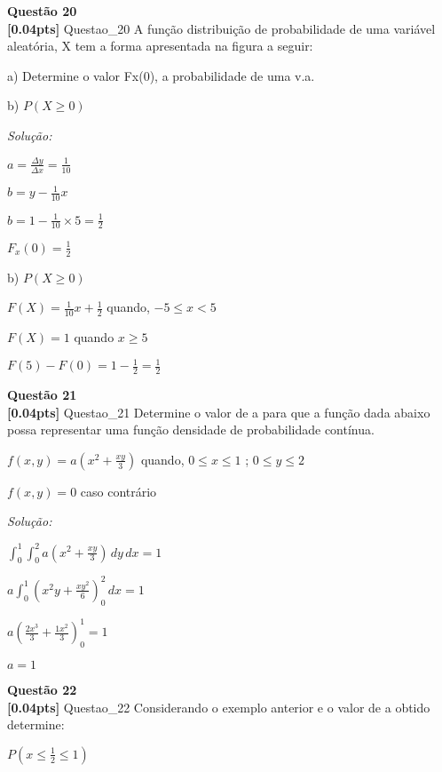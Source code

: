 \documentclass{article}
\newenvironment{problem}[2][Questão]
    { \begin{mdframed}[backgroundcolor=gray!20] \textbf{#1 #2} \\}
    {  \end{mdframed}}
\newenvironment{solution}
    {\textit{Solução:}}
    {}
\begin{document}
\begin{problem}{20}
\textbf{[0.04pts]} Questao\_20  A  função  distribuição  de  probabilidade  de  uma  variável  aleatória,  X  tem a forma apresentada na figura a seguir: 

a) Determine o valor Fx(0), a probabilidade de uma v.a.

b) $P(X \geq 0)$ 

\end{problem}

\begin{solution}

$a = \frac{\Delta y}{\Delta x} = \frac{1}{10}$

$b = y - \frac{1}{10}x$

$b = 1 - \frac{1}{10} \times 5 = \frac{1}{2}$

$F_{x}(0) = \frac{1}{2}$

b) $P(X \geq 0)$

$F(X) = \frac{1}{10}x + \frac{1}{2}$ quando, $-5 \leq x < 5$

$F(X) = 1$ quando $x \geq 5$

$F(5) - F(0) = 1 - \frac{1}{2} = \frac{1}{2}$


\end{solution}

\begin{problem}{21}
\textbf{[0.04pts]} Questao\_21 Determine  o  valor  de  a  para  que  a  função  dada  abaixo  possa  representar  uma função densidade de probabilidade contínua. 

$f(x,y) = a(x^{2} + \frac{xy}{3})$ quando, $0 \leq x \leq 1$ ; $0 \leq y \leq 2$

$f(x,y) = 0$ caso contrário

\end{problem}

\begin{solution}

$\int_{0}^{1} \int_{0}^{2} a(x^{2} + \frac{xy}{3}) \,dy \,dx = 1$

$a \int_{0}^{1} (x^{2}y + \frac{xy^{2}}{6})_{0}^{2} \,dx = 1$

$a (\frac{2x^{3}}{3} + \frac{1x^{2}}{3})_{0}^{1} = 1$

$ a=1$

\end{solution}

\begin{problem}{22}
\textbf{[0.04pts]} Questao\_22 Considerando o exemplo anterior e o valor de a obtido determine:

$P(x \leq \frac{1}{2} \leq 1)$

\end{problem}
\end{document}
